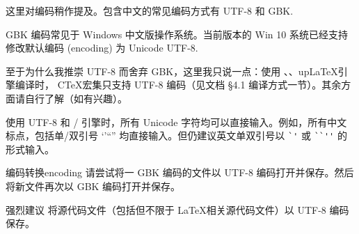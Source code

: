 这里对编码稍作提及。包含中文的常见编码方式有 UTF-8 和 GBK.

GBK 编码常见于 Windows 中文版操作系统。当前版本的 Win 10 系统已经支持修改默认编码 (encoding) 为 Unicode UTF-8.

至于为什么我推崇 UTF-8 而舍弃 GBK，这里我只说一点：使用 、、up\LaTeX 引擎编译时， C\TeX 宏集只支持 UTF-8 编码（见文档 \cite{ctex} \S 4.1 编译方式一节）。其余方面请自行了解（如有兴趣）。

使用 UTF-8 和 / 引擎时，所有 Unicode 字符均可以直接输入。例如，所有中文标点，包括单/双引号 ‘’“” 均直接输入。但仍建议英文单双引号以 \verb|`'| 或 \verb|``''| 的形式输入。

\begin{Ex}{编码转换}{encoding}
请尝试将一 GBK 编码的文件以 UTF-8 编码打开并保存。然后将新文件再次以 GBK 编码打开并保存。
\end{Ex}

\begin{mybox}{强烈建议}
将源代码文件（包括但不限于 \LaTeX 相关源代码文件）以 UTF-8 编码保存。
\end{mybox}